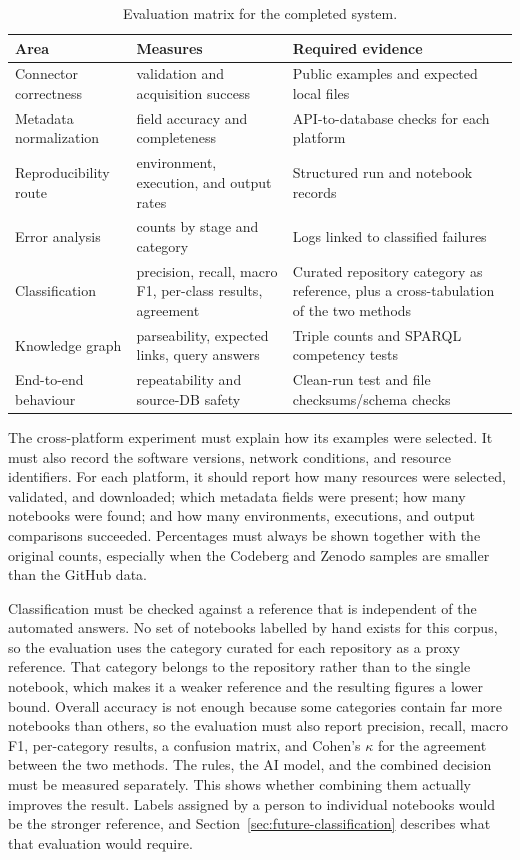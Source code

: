 \begin{table}[H]
\centering
\caption{Evaluation matrix for the completed system.}
\label{tab:evaluation-matrix}
\small
\begin{tabularx}{\textwidth}{@{}p{3.1cm}p{4.3cm}X@{}}
\toprule
Area & Measures & Required evidence\tabularnewline
\midrule
Connector correctness & validation and acquisition success & Public examples and expected local files\tabularnewline
Metadata normalization & field accuracy and completeness & API-to-database checks for each platform\tabularnewline
Reproducibility route & environment, execution, and output rates & Structured run and notebook records\tabularnewline
Error analysis & counts by stage and category & Logs linked to classified failures\tabularnewline
Classification & precision, recall, macro F1, per-class results, agreement & Curated repository category as reference, plus a cross-tabulation of the two methods\tabularnewline
Knowledge graph & parseability, expected links, query answers & Triple counts and SPARQL competency tests\tabularnewline
End-to-end behaviour & repeatability and source-DB safety & Clean-run test and file checksums/schema checks\tabularnewline
\bottomrule
\end{tabularx}
\end{table}

The cross-platform experiment must explain how its examples were selected. It must also record the software versions, network conditions, and resource identifiers. For each platform, it should report how many resources were selected, validated, and downloaded; which metadata fields were present; how many notebooks were found; and how many environments, executions, and output comparisons succeeded. Percentages must always be shown together with the original counts, especially when the Codeberg and Zenodo samples are smaller than the GitHub data.

Classification must be checked against a reference that is independent of the automated answers. No set of notebooks labelled by hand exists for this corpus, so the evaluation uses the category curated for each repository as a proxy reference. That category belongs to the repository rather than to the single notebook, which makes it a weaker reference and the resulting figures a lower bound. Overall accuracy is not enough because some categories contain far more notebooks than others, so the evaluation must also report precision, recall, macro F1, per-category results, a confusion matrix, and Cohen's $\kappa$ for the agreement between the two methods. The rules, the AI model, and the combined decision must be measured separately. This shows whether combining them actually improves the result. Labels assigned by a person to individual notebooks would be the stronger reference, and Section~\ref{sec:future-classification} describes what that evaluation would require.

